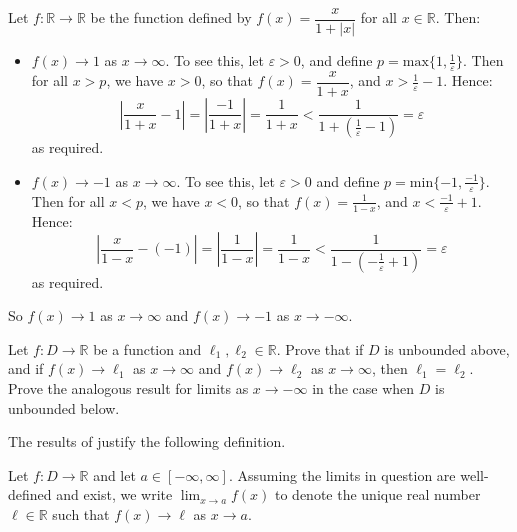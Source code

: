 \begin{example}
Let $f : \mathbb{R} \to \mathbb{R}$ be the function defined by $f(x) = \dfrac{x}{1+|x|}$ for all $x \in \mathbb{R}$. Then:
\begin{itemize}
\item $f(x) \to 1$ as $x \to \infty$. To see this, let $\varepsilon > 0$, and define $p = \mathrm{max} \{ 1, \frac{1}{\varepsilon} \}$. Then for all $x > p$, we have $x>0$, so that $f(x) = \dfrac{x}{1+x}$, and $x > \frac{1}{\varepsilon} - 1$. Hence:
\[ \left| \frac{x}{1+x} - 1 \right| = \left| \frac{-1}{1+x} \right| = \frac{1}{1+x} < \frac{1}{1+ (\frac{1}{\varepsilon}-1) } = \varepsilon \]
as required.
\item $f(x) \to -1$ as $x \to \infty$. To see this, let $\varepsilon > 0$ and define $p = \mathrm{min} \{ -1, \frac{-1}{\varepsilon} \}$. Then for all $x < p$, we have $x<0$, so that $f(x) = \frac{1}{1-x}$, and $x < \frac{-1}{\varepsilon} + 1$. Hence:
\[ \left| \frac{x}{1-x} - (-1) \right| = \left| \frac{1}{1-x} \right| = \frac{1}{1-x} < \frac{1}{1-(-\frac{1}{\varepsilon}+1)} = \varepsilon  \]
as required.
\end{itemize}
So $f(x) \to 1$ as $x \to \infty$ and $f(x) \to -1$ as $x \to -\infty$.
\end{example}

\begin{exercise}
\label{exInfiniteLimitsOfFunctionsAreUnique}
Let $f : D \to \mathbb{R}$ be a function and $\ell_1, \ell_2 \in \mathbb{R}$. Prove that if $D$ is unbounded above, and if $f(x) \to \ell_1$ as $x \to \infty$ and $f(x) \to \ell_2$ as $x \to \infty$, then $\ell_1=\ell_2$. Prove the analogous result for limits as $x \to -\infty$ in the case when $D$ is unbounded below.
\end{exercise}

The results of  justify the following definition.

\begin{definition}
\label{defLimitOfFunctionNotation}
Let $f : D \to \mathbb{R}$ and let $a \in [-\infty, \infty]$. Assuming the limits in question are well-defined and exist, we write $\displaystyle \lim_{x \to a} f(x)$ to denote the unique real number $\ell \in \mathbb{R}$ such that $f(x) \to \ell$ as $x \to a$.
\end{definition}


